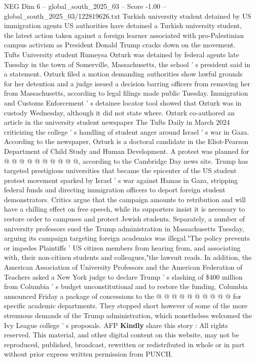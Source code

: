 \begin{textsample}{NEG Dim 6 – global\_south\_2025\_03 – Score -1.00 – global\_south\_2025\_03/122819626.txt}  \label{ex:f6_neg_138}
Turkish university student detained by US immigration agents US authorities have detained a Turkish university student, the latest action taken against a foreign learner associated with pro-Palestinian campus activism as President Donald Trump cracks down on the movement.
Tufts University student Rumeysa Ozturk was detained by federal agents late Tuesday in the town of Somerville, Massachusetts, the school ' s president said in a statement.
Ozturk filed a motion demanding authorities show lawful grounds for her detention and a judge issued a decision barring officers from removing her from Massachusetts, according to legal filings made public Tuesday.
Immigration and Customs Enforcement ' s detainee locator tool showed that Ozturk was in custody Wednesday, although it did not state where.
Ozturk co-authored an article in the university student newspaper The Tufts Daily in March 2024 criticizing the college ' s handling of student anger around Israel ' s war in Gaza.
According to the newspaper, Ozturk is a doctoral candidate in the Eliot-Pearson Department of Child Study and Human Development.
A protest was planned for @ @ @ @ @ @ @ @ @ @, according to the Cambridge Day news site.
Trump has targeted prestigious universities that became the epicenter of the US student protest movement sparked by Israel ' s war against Hamas in Gaza, stripping federal funds and directing immigration officers to deport foreign student demonstrators.
Critics argue that the campaign amounts to retribution and will have a chilling effect on free speech, while its supporters insist it is necessary to restore order to campuses and protect Jewish students.
Separately, a number of university professors sued the Trump administration in Massachusetts Tuesday, arguing its campaign targeting foreign academics was illegal."The policy prevents or impedes Plaintiffs ' US citizen members from hearing from, and associating with, their non-citizen students and colleagues,"the lawsuit reads.
In addition, the American Association of University Professors and the American Federation of Teachers asked a New York judge to declare Trump ' s slashing of \$400 million from Columbia ' s budget unconstitutional and to restore the funding.
Columbia announced Friday a package of concessions to the @ @ @ @ @ @ @ @ @ @ for specific academic departments.
They stopped short however of some of the more strenuous demands of the Trump administration, which nonetheless welcomed the Ivy League college ' s proposals.
AFP \textbf{Kindly} share this story : All rights reserved.
This material, and other digital content on this website, may not be reproduced, published, broadcast, rewritten or redistributed in whole or in part without prior express written permission from PUNCH.

\end{textsample}
